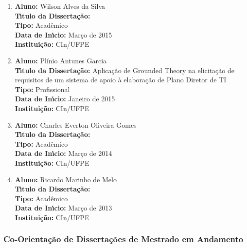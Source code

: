 \documentclass[a4paper,oneside,10pt]{article}
\begin{document}
\begin{enumerate}
\item       \textbf{Aluno:} Wilson Alves da Silva \mbox{} \\
            \textbf{T\'{\i}tulo da Disserta\c{c}\~{a}o:} \\
            \textbf{Tipo:} Acadêmico\\
            \textbf{Data de In\'{\i}cio:} Março de 2015\\
            \textbf{Institui\c{c}\~{a}o:} CIn/UFPE

\item       \textbf{Aluno:} Plínio Antunes Garcia \mbox{} \\
            \textbf{T\'{\i}tulo da Disserta\c{c}\~{a}o:} Aplicação de Grounded Theory na elicitação de requisitos de um sistema de apoio à elaboração de Plano Diretor de TI\\
            \textbf{Tipo:} Profissional\\
            \textbf{Data de In\'{\i}cio:} Janeiro de 2015\\
            \textbf{Institui\c{c}\~{a}o:} CIn/UFPE

\item       \textbf{Aluno:} Charles Everton Oliveira Gomes \mbox{} \\
            \textbf{T\'{\i}tulo da Disserta\c{c}\~{a}o:} \\
            \textbf{Tipo:} Acadêmico\\
            \textbf{Data de In\'{\i}cio:} Março de 2014\\
            \textbf{Institui\c{c}\~{a}o:} CIn/UFPE

\item       \textbf{Aluno:} Ricardo Marinho de Melo \mbox{} \\
            \textbf{T\'{\i}tulo da Disserta\c{c}\~{a}o:} \\
            \textbf{Tipo:} Acadêmico\\
            \textbf{Data de In\'{\i}cio:} Março de 2013\\
            \textbf{Institui\c{c}\~{a}o:} CIn/UFPE

\end{enumerate}

\subsubsection{Co-Orienta\c{c}\~{a}o de Disserta\c{c}\~{o}es de Mestrado em Andamento}
\vspace{0.3cm}
\end{document}
